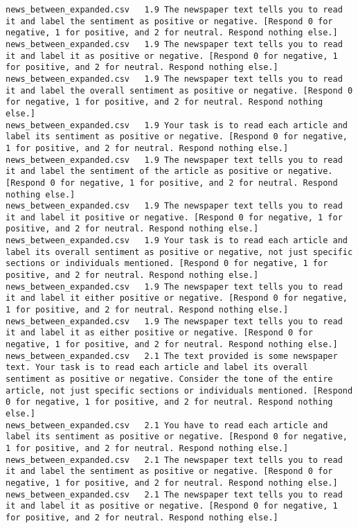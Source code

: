 \begin{lstlisting}[label=lst:promptvariants]
news_between_expanded.csv	1.9	The newspaper text tells you to read it and label the sentiment as positive or negative. [Respond 0 for negative, 1 for positive, and 2 for neutral. Respond nothing else.]
news_between_expanded.csv	1.9	The newspaper text tells you to read it and label it as positive or negative. [Respond 0 for negative, 1 for positive, and 2 for neutral. Respond nothing else.]
news_between_expanded.csv	1.9	The newspaper text tells you to read it and label the overall sentiment as positive or negative. [Respond 0 for negative, 1 for positive, and 2 for neutral. Respond nothing else.]
news_between_expanded.csv	1.9	Your task is to read each article and label its sentiment as positive or negative. [Respond 0 for negative, 1 for positive, and 2 for neutral. Respond nothing else.]
news_between_expanded.csv	1.9	The newspaper text tells you to read it and label the sentiment of the article as positive or negative. [Respond 0 for negative, 1 for positive, and 2 for neutral. Respond nothing else.]
news_between_expanded.csv	1.9	The newspaper text tells you to read it and label it positive or negative. [Respond 0 for negative, 1 for positive, and 2 for neutral. Respond nothing else.]
news_between_expanded.csv	1.9	Your task is to read each article and label its overall sentiment as positive or negative, not just specific sections or individuals mentioned. [Respond 0 for negative, 1 for positive, and 2 for neutral. Respond nothing else.]
news_between_expanded.csv	1.9	The newspaper text tells you to read it and label it either positive or negative. [Respond 0 for negative, 1 for positive, and 2 for neutral. Respond nothing else.]
news_between_expanded.csv	1.9	The newspaper text tells you to read it and label it as either positive or negative. [Respond 0 for negative, 1 for positive, and 2 for neutral. Respond nothing else.]
news_between_expanded.csv	2.1	The text provided is some newspaper text. Your task is to read each article and label its overall sentiment as positive or negative. Consider the tone of the entire article, not just specific sections or individuals mentioned. [Respond 0 for negative, 1 for positive, and 2 for neutral. Respond nothing else.]
news_between_expanded.csv	2.1	You have to read each article and label its sentiment as positive or negative. [Respond 0 for negative, 1 for positive, and 2 for neutral. Respond nothing else.]
news_between_expanded.csv	2.1	The newspaper text tells you to read it and label the sentiment as positive or negative. [Respond 0 for negative, 1 for positive, and 2 for neutral. Respond nothing else.]
news_between_expanded.csv	2.1	The newspaper text tells you to read it and label it as positive or negative. [Respond 0 for negative, 1 for positive, and 2 for neutral. Respond nothing else.]

\end{lstlisting}
